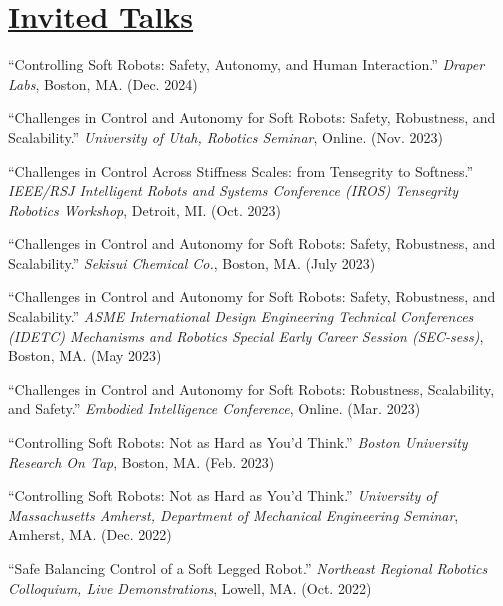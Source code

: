 \documentclass[letterpaper]{deedy-resume} %
\begin{document}
\section{\underline{Invited Talks}}
\vspace{0.2cm}

{}

 \begin{etaremune}[itemsep=0.1cm]

\setcounter{enumi}{31}

\item ``Controlling Soft Robots: Safety, Autonomy, and Human Interaction.'' {\it Draper Labs}, Boston, MA. (Dec. 2024)

\item ``Challenges in Control and Autonomy for Soft Robots: Safety, Robustness, and Scalability.'' {\it University of Utah, Robotics Seminar}, Online. (Nov. 2023)

\item ``Challenges in Control Across Stiffness Scales: from Tensegrity to Softness.'' {\it IEEE/RSJ Intelligent Robots and Systems Conference (IROS) Tensegrity Robotics Workshop}, Detroit, MI. (Oct. 2023)

\item ``Challenges in Control and Autonomy for Soft Robots: Safety, Robustness, and Scalability.'' {\it Sekisui Chemical Co.}, Boston, MA. (July 2023)

\item ``Challenges in Control and Autonomy for Soft Robots: Safety, Robustness, and Scalability.'' {\it ASME International Design Engineering Technical Conferences (IDETC) Mechanisms and Robotics Special Early Career Session (SEC-sess)}, Boston, MA. (May 2023)

\item ``Challenges in Control and Autonomy for Soft Robots: Robustness, Scalability, and Safety.'' {\it Embodied Intelligence Conference}, Online. (Mar. 2023)

\item ``Controlling Soft Robots: Not as Hard as You'd Think.'' {\it Boston University Research On Tap}, Boston, MA. (Feb. 2023)

\item ``Controlling Soft Robots: Not as Hard as You'd Think.'' {\it University of Massachusetts Amherst, Department of Mechanical Engineering Seminar}, Amherst, MA. (Dec. 2022)

\item ``Safe Balancing Control of a Soft Legged Robot.'' {\it Northeast Regional Robotics Colloquium, Live Demonstrations}, Lowell, MA. (Oct. 2022)


\end{etaremune}
\end{document}
